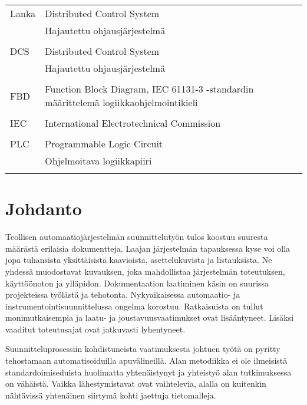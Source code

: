 \documentclass[finnish,12pt]{article}
\begin{document}
	\begin{tabular}{ll}
Lanka        & Distributed Control System \\
	     	      & Hajautettu ohjausjärjestelmä \\ \\
	     	    
DCS        & Distributed Control System \\
        &   Hajautettu ohjausjärjestelmä \\ \\
        
FBD         & Function Block Diagram, IEC 61131-3 -standardin määrittelemä logiikkaohjelmointikieli\\\\
IEC          & International Electrotechnical Commission\\\\
PLC         & Programmable Logic Circuit \\
	      & Ohjelmoitava logiikkapiiri\\\\



	\end{tabular}

	\cleardoublepage
	\storeinipagenumber
	\setcounter{page}{1}


	\section{Johdanto}
	\thispagestyle{empty}

Teollisen automaatiojärjestelmän suunnittelutyön tulos koostuu suuresta määrästä erilaisia dokumentteja.
Laajan järjestelmän tapauksessa kyse voi olla jopa tuhansista yksittäisistä kaavioista, asettelukuvista ja listauksista.
Ne yhdessä muodostavat kuvauksen, joka mahdollistaa järjestelmän toteutuksen, käyttöönoton ja ylläpidon.
Dokumentaation laatiminen käsin on suurissa projekteissa työlästä ja tehotonta.
Nykyaikaisessa automaatio- ja instrumentointisuunnittelussa ongelma korostuu.
Ratkaisuista on tullut monimutkaisempia ja laatu- ja joustavuusvaatimukset ovat lisääntyneet.
Lisäksi vaaditut toteutusajat ovat jatkuvasti lyhentyneet.
\cite{RefWorks:41}

Suunnitteluprosessiin kohdistuneista vaatimuksesta johtuen työtä on pyritty tehostamaan automatisoiduilla apuvälineillä.
Alan metodiikka ei ole ilmeisistä standardoimiseduista huolimatta yhtenäistynyt ja yhteistyö alan tutkimuksessa on vähäistä.
Vaikka lähestymistavat ovat vaihtelevia, alalla on kuitenkin nähtävissä yhtenäinen siirtymä kohti jaettuja tietomalleja.
\end{document}
